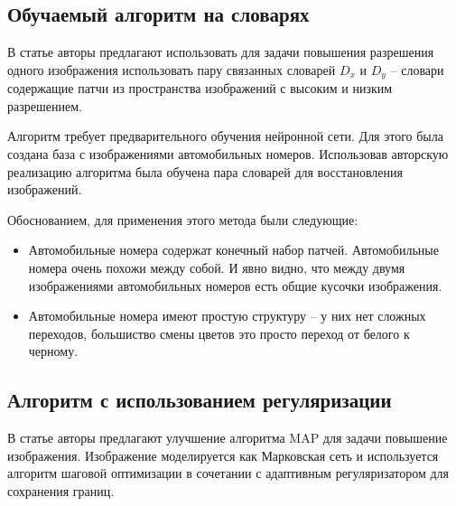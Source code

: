 \subsection{Обучаемый алгоритм на словарях}
В статье \cite{yang2012coupled} авторы предлагают использовать для задачи повышения разрешения одного изображения
использовать пару связанных словарей $D_x$ и $D_y$ -- словари содержащие патчи из пространства изображений
с высоким и низким разрешением.

Алгоритм требует предварительного обучения нейронной сети. Для этого была создана база с изображениями автомобильных
номеров. Использовав авторскую реализацию алгоритма была обучена пара словарей для восстановления изображений.

Обоснованием, для применения этого метода были следующие:
\begin{itemize}
  \item Автомобильные номера содержат конечный набор патчей. Автомобильные номера очень похожи между собой. И явно
    видно, что между двумя изображениями автомобильных номеров есть общие кусочки изображения.
  \item Автомобильные номера имеют простую структуру -- у них нет сложных переходов, большиство смены цветов это просто
    переход от белого к черному.
\end{itemize}

\subsection{Алгоритм с использованием регуляризации}
В статье \cite{yuan2008fast} авторы предлагают улучшение алгоритма MAP для задачи повышение изображения. Изображение
моделируется как Марковская сеть и используется алгоритм шаговой оптимизации в сочетании с адаптивным
регуляризатором для сохранения границ.

